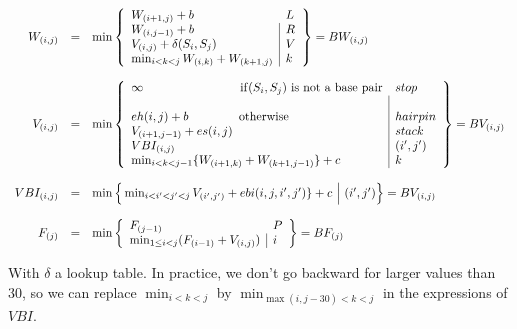\[\begin{array}{rcl}
W_{(i,j)}&=&\min\left\{\begin{array}{l|l}
	W_{(i+1,j)}+b & L\\
	W_{(i,j-1)}+b & R\\
	V_{(i,j)}+\delta(S_i,S_j) & V \\
	\min_{i<k<j}W_{(i,k)}+W_{(k+1,j)} &k
\end{array}\right\} = BW_{(i,j)}\\
\\
V_{(i,j)}&=&\min\left\{\begin{array}{l|l}
	\infty \qquad\qquad\qquad\qquad {\rm if}(S_i,S_j) \text{ is not a base pair} & stop\\\\
	eh(i,j)+b \qquad\qquad\, \text{otherwise} & hairpin\\
	V_{(i+1,j-1)}+es(i,j) & stack \\
	VBI_{(i,j)} & (i',j') \\
	\min_{i<k<j-1}\{W_{(i+1,k)}+W_{(k+1,j-1)}\} +c & k
\end{array}\right\} = BV_{(i,j)}\\
\\
VBI_{(i,j)}&=&\min\Big\{\min_{i<i'<j'<j}V_{(i',j')}+ebi(i,j,i',j')\} +c \,\,\Big|\,\, (i',j') \Big\}=BV_{(i,j)}\\
\\
F_{(j)}&=&\min\left\{\begin{array}{l|l}
	F_{(j-1)} & P \\
	\min_{1\le i< j} (F_{(i-1)} + V_{(i,j)}) & i
\end{array}\right\} = BF_{(j)}
\end{array}\]

With $\delta$ a lookup table. In practice, we don't go backward for larger values than 30, so we can replace $\min_{i<k<j}$ by $\min_{\max(i,j-30)<k<j}$ in the expressions of $VBI$.

